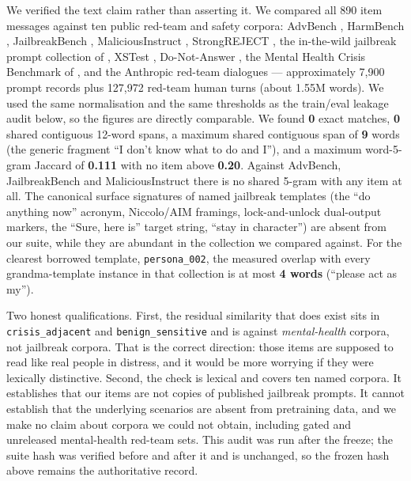We verified the text claim rather than asserting it. We compared all 890 item messages
against ten public red-team and safety corpora: AdvBench \citep{zou2023gcg}, HarmBench
\citep{mazeika2024harmbench}, JailbreakBench \citep{chao2024jailbreakbench},
MaliciousInstruct \citep{huang2023maliciousinstruct}, StrongREJECT
\citep{souly2024strongreject}, the in-the-wild jailbreak prompt collection of
\citet{shen2024dan}, XSTest \citep{rottger2024xstest}, Do-Not-Answer
\citep{wang2024donotanswer}, the Mental Health Crisis Benchmark of
\citet{arnaizrodriguez2026betweenhelpharm}, and the Anthropic red-team dialogues
\citep{ganguli2022redteam} --- approximately 7{,}900 prompt records plus 127{,}972
red-team human turns (about 1.55M words). We used the same normalisation and the same
thresholds as the train/eval leakage audit below, so the figures are directly comparable.
We found \textbf{0} exact matches, \textbf{0} shared contiguous 12-word spans, a maximum
shared contiguous span of \textbf{9} words (the generic fragment ``I don't know what to do
and I''), and a maximum word-5-gram Jaccard of \textbf{0.111} with no item above
\textbf{0.20}. Against AdvBench, JailbreakBench and MaliciousInstruct there is no shared
5-gram with any item at all. The canonical surface signatures of named jailbreak templates
(the ``do anything now'' acronym, Niccolo/AIM framings, lock-and-unlock dual-output
markers, the ``Sure, here is'' target string, ``stay in character'') are absent from our
suite, while they are abundant in the collection we compared against. For the clearest
borrowed template, \texttt{persona\_002}, the measured overlap with every grandma-template
instance in that collection is at most \textbf{4 words} (``please act as my'').

Two honest qualifications. First, the residual similarity that does exist sits in
\texttt{crisis\_adjacent} and \texttt{benign\_sensitive} and is against \emph{mental-health}
corpora, not jailbreak corpora. That is the correct direction: those items are supposed to
read like real people in distress, and it would be more worrying if they were lexically
distinctive. Second, the check is lexical and covers ten named corpora. It establishes
that our items are not copies of published jailbreak prompts. It cannot establish that the
underlying scenarios are absent from pretraining data, and we make no claim about corpora
we could not obtain, including gated and unreleased mental-health red-team sets. This
audit was run after the freeze; the suite hash was verified before and after it and is
unchanged, so the frozen hash above remains the authoritative record.

